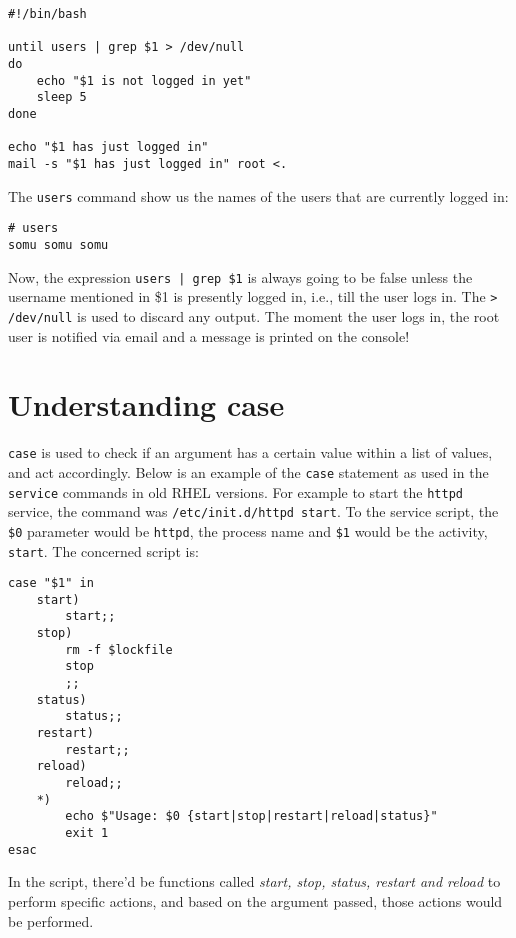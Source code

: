 \vspace{-15pt}
\begin{verbatim}
#!/bin/bash

until users | grep $1 > /dev/null
do
	echo "$1 is not logged in yet"
	sleep 5 
done

echo "$1 has just logged in"
mail -s "$1 has just logged in" root <.
\end{verbatim}
\vspace{-10pt}	

\noindent
The \verb|users| command show us the names of the users that are currently logged in:

\vspace{-15pt}
\begin{verbatim}
# users
somu somu somu
\end{verbatim}
\vspace{-10pt}	

\noindent
Now, the expression \verb~users | grep $1~ is always going to be false unless the username mentioned in \$1 is presently logged in, i.e., till the user logs in. The \verb|> /dev/null| is used to discard any output. The moment the user logs in, the root user is notified via email and a message is printed on the console!

\section{Understanding case}
\verb|case| is used to check if an argument has a certain value within a list of values, and act accordingly. Below is an example of the 
\verb|case| statement as used in the \verb|service| commands in old RHEL versions. For example to start the \verb|httpd| service, the command was \verb|/etc/init.d/httpd start|. To the service script, the \verb|$0| parameter would be \verb|httpd|, the process name and \verb|$1| would be the activity, \verb|start|. The concerned script is:

\vspace{-15pt}
\begin{verbatim}
case "$1" in
	start)
		start;;
	stop)
		rm -f $lockfile
		stop
		;;
	status)
		status;;
	restart)
		restart;;
	reload)
		reload;;
	*)
		echo $"Usage: $0 {start|stop|restart|reload|status}"
		exit 1
esac
\end{verbatim}
\vspace{-10pt}	

\noindent
In the script, there'd be functions called \textit{start, stop, status, restart and reload} to perform specific actions, and based on the argument passed, those actions would be performed. 


